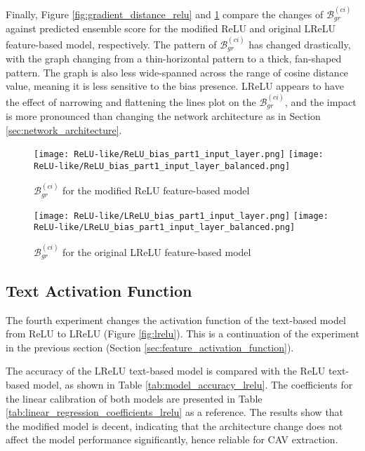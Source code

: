 Finally, Figure \ref{fig:gradient_distance_relu} and \ref{fig:gradient_distance_lrelu} compare the changes of $\mathcal{B}^{(ci)}_{gr}$ against predicted ensemble score for the modified ReLU and original LReLU feature-based model, respectively. The pattern of $\mathcal{B}^{(ci)}_{gr}$ has changed drastically, with the graph changing from a thin-horizontal pattern to a thick, fan-shaped pattern. The graph is also less wide-spanned across the range of cosine distance value, meaning it is less sensitive to the bias presence. LReLU appears to have the effect of narrowing and flattening the lines plot on the $\mathcal{B}^{(ci)}_{gr}$, and the impact is more pronounced than changing the network architecture as in Section \ref{sec:network_architecture}.

\begin{figure}[H]
    \centering
    \begin{minipage}[t]{0.48\textwidth}
        \centering
        \texttt{[image: ReLU-like/ReLU\_bias\_part1\_input\_layer.png]}
        \hfill
        \texttt{[image: ReLU-like/ReLU\_bias\_part1\_input\_layer\_balanced.png]}
        \caption{$\mathcal{B}^{(ci)}_{gr}$ for the modified ReLU feature-based model}
        \label{fig:gradient_distance_relu}
    \end{minipage}
    \hfill
    \begin{minipage}[t]{0.48\textwidth}
        \centering
        \texttt{[image: ReLU-like/LReLU\_bias\_part1\_input\_layer.png]}
        \hfill
        \texttt{[image: ReLU-like/LReLU\_bias\_part1\_input\_layer\_balanced.png]}
        \caption{$\mathcal{B}^{(ci)}_{gr}$ for the original LReLU feature-based model}
        \label{fig:gradient_distance_lrelu}
    \end{minipage}
\end{figure}


\subsection{Text Activation Function}
The fourth experiment changes the activation function of the text-based model from ReLU to LReLU (Figure \ref{fig:lrelu}). This is a continuation of the experiment in the previous section (Section \ref{sec:feature_activation_function}).

The accuracy of the LReLU text-based model is compared with the ReLU text-based model, as shown in Table \ref{tab:model_accuracy_lrelu}. The coefficients for the linear calibration of both models are presented in Table \ref{tab:linear_regression_coefficients_lrelu} as a reference. The results show that the modified model is decent, indicating that the architecture change does not affect the model performance significantly, hence reliable for CAV extraction.

